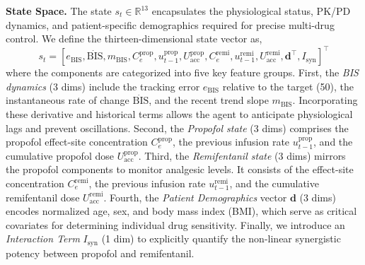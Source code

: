 \documentclass[pdflatex,sn-mathphys-num]{sn-jnl}%
\newcommand{\BfPara}[1]{{\noindent\bf#1.}\xspace}
\theoremstyle{thmstyleone}%
\theoremstyle{thmstyletwo}%
\theoremstyle{thmstylethree}%
\begin{document}
\BfPara{State Space}
The state $s_t \in \mathbb{R}^{13}$ encapsulates the physiological status, PK/PD dynamics, and patient-specific demographics required for precise multi-drug control. We define the thirteen-dimensional state vector as,
\begin{equation}
   s_t = [e_{\text{BIS}},\! \dot{\text{BIS}},\! m_{\text{BIS}},\! C_{e}^{\text{prop}},\! u_{t-1}^{\text{prop}},\! U_{\text{acc}}^{\text{prop}},\! C_{e}^{\text{remi}},\! u_{t-1}^{\text{remi}},\! U_{\text{acc}}^{\text{remi}},\! \mathbf{d}^\top\!,\! I_{\text{syn}}]^\top
\end{equation}
where the components are categorized into five key feature groups.
First, the \textit{BIS dynamics} (3 dims) include the tracking error $e_{\text{BIS}}$ relative to the target (50), the instantaneous rate of change $\dot{\text{BIS}}$, and the recent trend slope $m_{\text{BIS}}$. Incorporating these derivative and historical terms allows the agent to anticipate physiological lags and prevent oscillations.
%
Second, the \textit{Propofol state} (3 dims) comprises the propofol effect-site concentration $C_{e}^{\text{prop}}$, the previous infusion rate $u_{t-1}^{\text{prop}}$, and the cumulative propofol dose $U_{\text{acc}}^{\text{prop}}$.
%
Third, the \textit{Remifentanil state} (3 dims) mirrors the propofol components to monitor analgesic levels. It consists of the effect-site concentration $C_{e}^{\text{remi}}$, the previous infusion rate $u_{t-1}^{\text{remi}}$, and the cumulative remifentanil dose $U_{\text{acc}}^{\text{remi}}$.
%
Fourth, the \textit{Patient Demographics} vector $\mathbf{d}$ (3 dims) encodes normalized age, sex, and body mass index (BMI), which serve as critical covariates for determining individual drug sensitivity.
%
Finally, we introduce an \textit{Interaction Term} $I_{\text{syn}}$ (1 dim) to explicitly quantify the non-linear synergistic potency between propofol and remifentanil.
\end{document}
